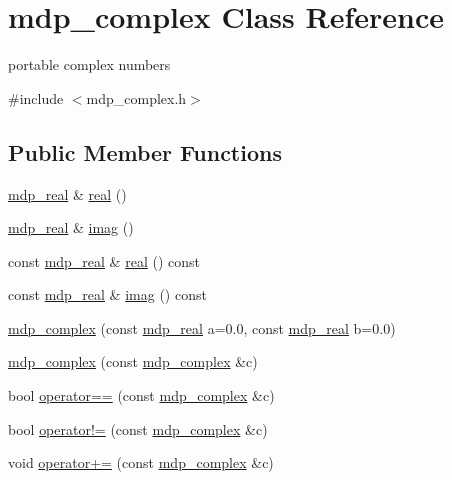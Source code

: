 \hypertarget{classmdp__complex}{
\section{mdp\_\-complex Class Reference}
\label{classmdp__complex}
}


portable complex numbers  


{\ttfamily \#include $<$mdp\_\-complex.h$>$}\subsection*{Public Member Functions}
\begin{DoxyCompactItemize}
\item 
\hyperlink{mdp__global__vars_8h_a049e4c1d4e74d644878a42f9909463e4}{mdp\_\-real} \& \hyperlink{classmdp__complex_ad24f185648ad4231abbf362ed1fab64b}{real} ()
\item 
\hyperlink{mdp__global__vars_8h_a049e4c1d4e74d644878a42f9909463e4}{mdp\_\-real} \& \hyperlink{classmdp__complex_a6426bc039248f24201db0e4344bf2409}{imag} ()
\item 
const \hyperlink{mdp__global__vars_8h_a049e4c1d4e74d644878a42f9909463e4}{mdp\_\-real} \& \hyperlink{classmdp__complex_a7055611c45f5cfb6e12053d4e9bc77dd}{real} () const 
\item 
const \hyperlink{mdp__global__vars_8h_a049e4c1d4e74d644878a42f9909463e4}{mdp\_\-real} \& \hyperlink{classmdp__complex_a968b27741c048c98cf48e22936258904}{imag} () const 
\item 
\hyperlink{classmdp__complex_aeb3ec4ef78af98be64dc82c9a2105820}{mdp\_\-complex} (const \hyperlink{mdp__global__vars_8h_a049e4c1d4e74d644878a42f9909463e4}{mdp\_\-real} a=0.0, const \hyperlink{mdp__global__vars_8h_a049e4c1d4e74d644878a42f9909463e4}{mdp\_\-real} b=0.0)
\item 
\hyperlink{classmdp__complex_a99833fa0efd97e5a5d95afd237ac5c7c}{mdp\_\-complex} (const \hyperlink{classmdp__complex}{mdp\_\-complex} \&c)
\item 
bool \hyperlink{classmdp__complex_a51ddcf2928115838abd81fd365876d19}{operator==} (const \hyperlink{classmdp__complex}{mdp\_\-complex} \&c)
\item 
bool \hyperlink{classmdp__complex_ae2e655d313ce4433ca59dcfb59b94cff}{operator!=} (const \hyperlink{classmdp__complex}{mdp\_\-complex} \&c)
\item 
void \hyperlink{classmdp__complex_a082aab81b5bc1b42e1ad09bd0f52d710}{operator+=} (const \hyperlink{classmdp__complex}{mdp\_\-complex} \&c)

\end{DoxyCompactItemize}
